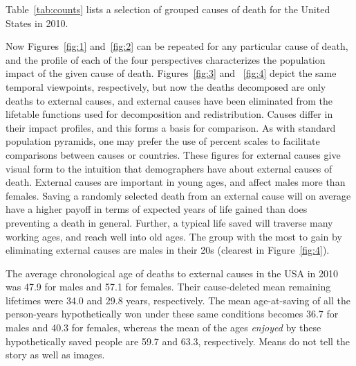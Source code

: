\documentclass{article}
\begin{document}
Table~\ref{tab:counts} lists a selection of grouped causes of death for the
United States in 2010.

Now Figures~\ref{fig:1} and~\ref{fig:2}
can be repeated for any particular cause of death, and the profile of each of the four perspectives
characterizes the population impact of the given cause of death.
Figures~\ref{fig:3} and~ \ref{fig:4} depict the same temporal viewpoints,
respectively, but now the deaths decomposed are only deaths to external
causes, and external causes have been eliminated from the lifetable functions used for decomposition and
 redistribution. Causes differ in their impact profiles, and this forms a
 basis for comparison. As with standard population pyramids, one may prefer the
 use of percent scales to facilitate comparisons between causes or countries. These
 figures for external causes give visual form to the intuition that demographers
 have about external causes of death. External causes are important in
 young ages, and affect males more than females. Saving a randomly selected death from an external
 cause will on average have a higher payoff in terms of expected years of life gained than does preventing a death in general. Further,
 a typical life saved will traverse many working ages, and reach well into old
 ages.
 The group with the most to gain by eliminating external causes are males in
 their 20s (clearest in Figure~\ref{fig:4}).
 
 The average chronological age of deaths to external causes in the USA in 2010
 was 47.9 for males and 57.1 for females. Their cause-deleted mean remaining
 lifetimes were 34.0 and 29.8 years, respectively. The mean age-at-saving of all
 the person-years hypothetically won under these same conditions becomes 36.7
 for males and 40.3 for females, whereas the mean of the ages \textit{enjoyed}
 by these hypothetically saved people are 59.7 and 63.3, respectively. Means do
 not tell the story as well as images. 
\end{document}
